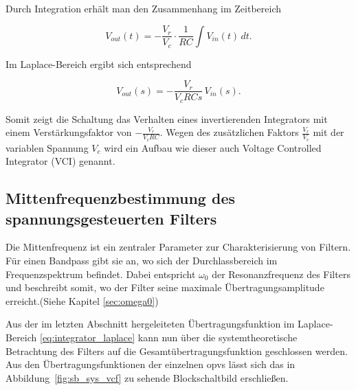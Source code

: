 \documentclass[../main.tex]{subfiles}
\begin{document}
Durch Integration erhält man den Zusammenhang im Zeitbereich

\begin{equation}
    V_{out}(t) = -\frac{V_r}{V_c} \cdot \frac{1}{RC} \int V_{in}(t) \, dt.
\label{eq:integrator_time}
\end{equation}

Im Laplace-Bereich ergibt sich entsprechend

\begin{equation}
V_{out}(s) = -\frac{V_r}{V_cRCs} \, V_{in}(s).
\label{eq:integrator_laplace}
\end{equation}

Somit zeigt die Schaltung das Verhalten eines invertierenden Integrators mit einem Verstärkungsfaktor von $-\frac{V_r}{V_cRC}$. Wegen des zusätzlichen Faktors $\frac{V_r}{V_c}$ mit der variablen Spannung $V_c$ wird ein Aufbau wie dieser auch Voltage Controlled Integrator (VCI) genannt.






\subsection{Mittenfrequenzbestimmung des spannungsgesteuerten Filters}
\label{sec:theorie_w0}
Die Mittenfrequenz ist ein zentraler Parameter zur Charakterisierung von Filtern. Für einen Bandpass gibt sie an, wo sich der Durchlassbereich im Frequenzspektrum befindet. Dabei entspricht $\omega_0$ der Resonanzfrequenz des Filters und beschreibt somit, wo der Filter seine maximale Übertragungsamplitude erreicht.(Siehe Kapitel \ref{sec:omega0})\par
\medskip
Aus der im letzten Abschnitt hergeleiteten Übertragungsfunktion im Laplace-Bereich \eqref{eq:integrator_laplace} kann nun über die systemtheoretische Betrachtung des Filters auf die Gesamtübertragungsfunktion geschlossen werden. Aus den Übertragungsfunktionen der einzelnen \glspl{opv} lässt sich das in Abbildung~\ref{fig:sb_sys_vcf} zu sehende Blockschaltbild erschließen.
\end{document}
